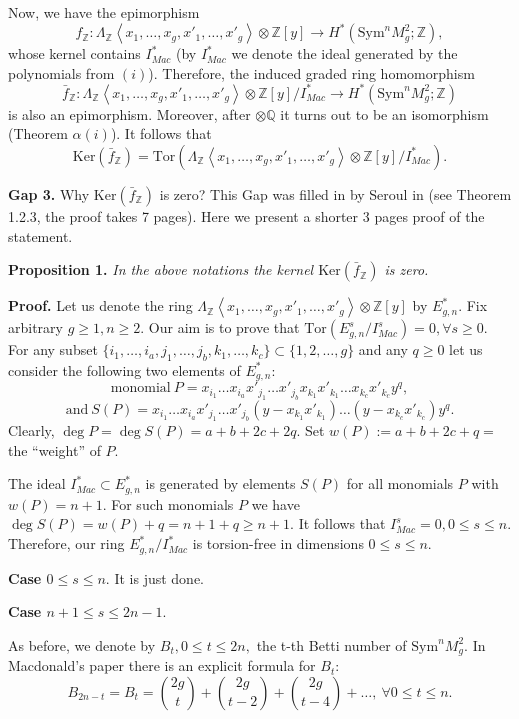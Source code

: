 \documentclass[a4paper,14pt]{article}
\newcommand{\Sym}{\mathrm{Sym}}
\newcommand{\Tor}{\mathrm{Tor}}
\newcommand{\Q}{\mathbb{Q}}
\newcommand{\Z}{\mathbb{Z}}
\begin{document}
Now, we have the epimorphism
$$
f_{\Z}: \Lambda_{\Z} \left< x_1,\ldots,x_g,x'_1,\ldots,x'_g \right>\otimes \Z[y] \to H^*(\Sym^n M^2_g;\Z),
$$
whose kernel contains $I^*_{Mac}$ (by $I^*_{Mac}$ we denote the ideal generated by the polynomials from $(i)$). Therefore, the induced graded ring homomorphism
$$
\bar{f}_{\Z}: \Lambda_{\Z} \left< x_1,\ldots,x_g,x'_1,\ldots,x'_g \right>\otimes \Z[y]/ I^*_{Mac} \to H^*(\Sym^n M^2_g;\Z)
$$
is also an epimorphism. Moreover, after $\otimes \Q$ it turns out to be an isomorphism (Theorem $\alpha (i)$). It follows that 
$$
\mathrm{Ker}(\bar{f}_{\Z}) = \Tor(\Lambda_{\Z} \left< x_1,\ldots,x_g,x'_1,\ldots,x'_g \right>\otimes \Z[y]/ I^*_{Mac}).
$$

{\bf Gap 3.} Why $\mathrm{Ker}(\bar{f}_{\Z})$ is zero? This Gap was filled in by Seroul in \cite{Ser} (see Theorem 1.2.3, the proof takes 7 pages). Here we present a shorter 3 pages  proof of the statement. 



{\bf Proposition 1.} {\it In the above notations the kernel $\mathrm{Ker}(\bar{f}_{\Z})$ is zero.}

{\bf Proof.} Let us denote the ring $\Lambda_{\Z} \left< x_1,\ldots,x_g,x'_1,\ldots,x'_g \right>\otimes \Z[y] $ by $E^*_{g,n}$. Fix arbitrary $g\ge 1, n\ge 2$. Our aim is to prove that $\Tor(E^s_{g,n}/I^s_{Mac}) = 0, \forall s\ge 0$. \\
For any subset $\{i_1,\ldots,i_a,j_1,\ldots,j_b,k_1,\ldots,k_c\}\subset \{1,2,\ldots,g\}$ and any $q\ge 0$ let us consider the following two elements of $E^*_{g,n}$:
$$
\mathrm{monomial}  \  P = x_{i_1}\ldots x_{i_a}x'_{j_1}\ldots x'_{j_b}x_{k_1}x'_{k_1}\ldots x_{k_c}x'_{k_c}y^q,
$$
$$
\mathrm{and} \ S(P) = x_{i_1}\ldots x_{i_a}x'_{j_1}\ldots x'_{j_b}(y - x_{k_1}x'_{k_1})\ldots (y - x_{k_c}x'_{k_c})y^q.
$$
Clearly, $\deg P=\deg S(P) = a+b+2c+2q$. Set $w(P):=a+b+2c+q =$ the ``weight'' of $P$. 


The ideal $I^*_{Mac}\subset E^*_{g,n}$ is generated by elements $S(P)$ for all monomials $P$ with $w(P)=n+1$. For such monomials $P$ we have $\deg S(P) = w(P) + q = n + 1 + q \ge n+1$. It follows that $I^s_{Mac}=0, 0\le s\le n.$ Therefore, our ring $E^*_{g,n}/I^*_{Mac}$ is torsion-free in dimensions $0\le s\le n$. 

{\bf Case $0\le s\le n$}. It is just done. 

{\bf Case $n+1\le s\le 2n-1$}. 

As before, we denote by $B_t, 0\le t\le 2n,$ the t-th Betti number of $\Sym^n M^2_g$. In Macdonald's paper there is an explicit formula for $B_t$:
$$
B_{2n-t} = B_t = \binom{2g}{t} + \binom{2g}{t-2} + \binom{2g}{t-4} + \ldots, \ \forall 0\le t\le n.
$$
\end{document}
